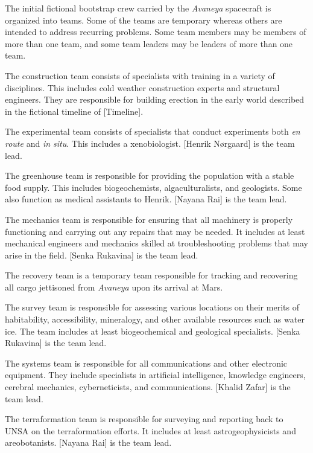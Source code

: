 

The initial fictional bootstrap crew carried by the {\it Avaneya} spacecraft is organized into teams. Some of the teams are temporary whereas others are intended to address recurring problems. Some team members may be members of more than one team, and some team leaders may be leaders of more than one team.

The construction team consists of specialists with training in a variety of disciplines. This includes cold weather construction experts and structural engineers. They are responsible for building erection in the early world described in the fictional timeline of [Timeline].

The experimental team consists of specialists that conduct experiments both {\it en route} and {\it in situ}. This includes a xenobiologist. [Henrik Nørgaard] is the team lead.

The greenhouse team is responsible for providing the population with a stable food supply. This includes biogeochemists, algaculturalists, and geologists. Some also function as medical assistants to Henrik. [Nayana Rai] is the team lead.

The mechanics team is responsible for ensuring that all machinery is properly functioning and carrying out any repairs that may be needed. It includes at least mechanical engineers and mechanics skilled at troubleshooting problems that may arise in the field. [Senka Rukavina] is the team lead.

The recovery team is a temporary team responsible for tracking and recovering all cargo jettisoned from {\it Avaneya} upon its arrival at Mars.

The survey team is responsible for assessing various locations on their merits of habitability, accessibility, mineralogy, and other available resources such as water ice. The team includes at least biogeochemical and geological specialists. [Senka Rukavina] is the team lead.

The systems team is responsible for all communications and other electronic equipment. They include specialists in artificial intelligence, knowledge engineers, cerebral mechanics, cyberneticists, and communications. [Khalid Zafar] is the team lead.

The terraformation team is responsible for surveying and reporting back to UNSA on the terraformation efforts. It includes at least astrogeophysicists and areobotanists. [Nayana Rai] is the team lead.

